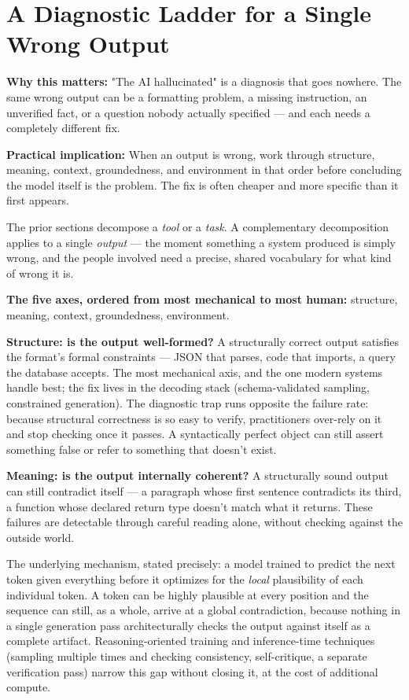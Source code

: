 \section{A Diagnostic Ladder for a Single Wrong Output}

\textbf{Why this matters:} "The AI hallucinated" is a diagnosis that goes nowhere. The same wrong output can be a formatting problem, a missing instruction, an unverified fact, or a question nobody actually specified --- and each needs a completely different fix.

\textbf{Practical implication:} When an output is wrong, work through structure, meaning, context, groundedness, and environment in that order before concluding the model itself is the problem. The fix is often cheaper and more specific than it first appears.

The prior sections decompose a \emph{tool} or a \emph{task}. A complementary decomposition applies to a single \emph{output} --- the moment something a system produced is simply wrong, and the people involved need a precise, shared vocabulary for what kind of wrong it is.

\textbf{The five axes, ordered from most mechanical to most human:} structure, meaning, context, groundedness, environment.

\textbf{Structure: is the output well-formed?} A structurally correct output satisfies the format's formal constraints --- JSON that parses, code that imports, a query the database accepts. The most mechanical axis, and the one modern systems handle best; the fix lives in the decoding stack (schema-validated sampling, constrained generation). The diagnostic trap runs opposite the failure rate: because structural correctness is so easy to verify, practitioners over-rely on it and stop checking once it passes. A syntactically perfect object can still assert something false or refer to something that doesn't exist.

\textbf{Meaning: is the output internally coherent?} A structurally sound output can still contradict itself --- a paragraph whose first sentence contradicts its third, a function whose declared return type doesn't match what it returns. These failures are detectable through careful reading alone, without checking against the outside world.

The underlying mechanism, stated precisely: a model trained to predict the next token given everything before it optimizes for the \emph{local} plausibility of each individual token. A token can be highly plausible at every position and the sequence can still, as a whole, arrive at a global contradiction, because nothing in a single generation pass architecturally checks the output against itself as a complete artifact. Reasoning-oriented training and inference-time techniques (sampling multiple times and checking consistency, self-critique, a separate verification pass) narrow this gap without closing it, at the cost of additional compute.

